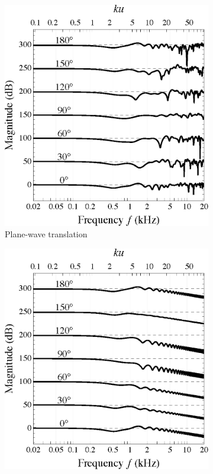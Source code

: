 \begin{figure}[t]
    	\centering
    	\begin{subfigure}[b]{0.49\textwidth}
        		\includegraphics[width=\textwidth]{07_characterization_extrapolation/figures/sourceAz_freqResp_pwt.eps}
        		\caption{Plane-wave translation}
        		\label{fig:07_Characterization_Extrapolation:Azimuth_Dependence:PWT}
    	\end{subfigure}
	\hfill
    	\begin{subfigure}[b]{0.49\textwidth}
        		\includegraphics[width=\textwidth]{07_characterization_extrapolation/figures/sourceAz_freqResp_sre.eps}

\end{subfigure}
\end{figure}
